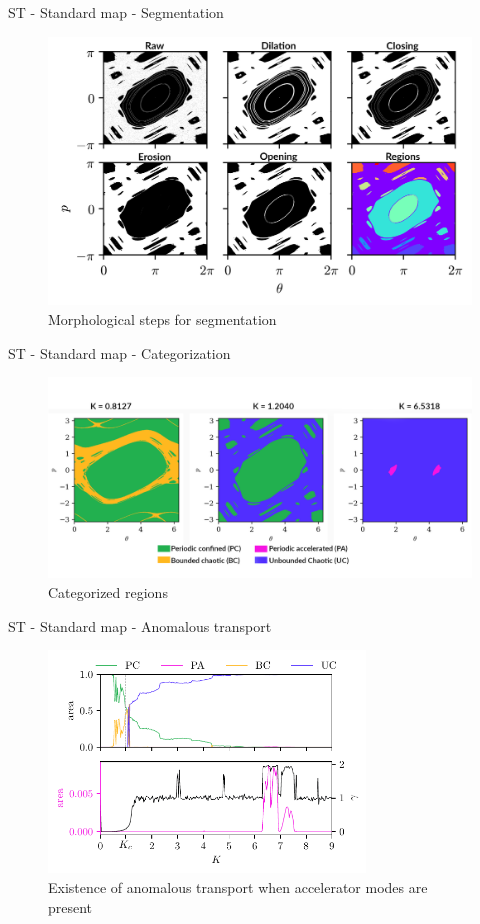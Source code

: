 \documentclass[10pt]{beamer}
\begin{document}
\begin{frame}{ST - Standard map - Segmentation}
    \begin{figure}
        \includegraphics[width = \textwidth]{std/mm_6.png}
        \caption{Morphological steps for segmentation}
    \end{figure}
\end{frame}

\begin{frame}{ST - Standard map - Categorization}
    \begin{figure}
        \includegraphics[width = \textwidth]{std/types.png}
        \caption{Categorized regions}
    \end{figure}
\end{frame}


\begin{frame}{ST - Standard map - Anomalous transport}
    \begin{figure}
        \includegraphics[width = 0.75\textwidth]{std/areas.pdf}
        \caption{Existence of anomalous transport when accelerator modes are present}
    \end{figure}
\end{frame}
\end{document}
